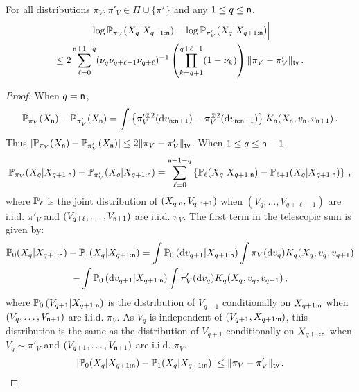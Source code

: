 \begin{lemma}\label{lem:IncrementsGen}
For all distributions $\pi_V,\pi'_V\in\Pi\cup\{\pi^{\star}\}$ and any $1\le q\le {\mathsf n}$,
\begin{multline*}
\left|\log \mathbb{P}_{\pi_V}(X_{q}|X_{q+1:{\mathsf n}}) - \log \mathbb{P}_{\pi'_V}(X_{q}|X_{q+1:{\mathsf n}})\right| \\
\leq 2\sum_{\ell= 0}^{{\mathsf n}+1-q}(\nu_{q}\nu_{q+\ell-1}\nu_{q+\ell})^{-1}\left(\prod_{k = q+1}^{q+\ell-1}(1-\nu_k)\right)\|\pi_V-\pi'_V\|_{\mathsf{tv}}\,.
\end{multline*}
\end{lemma}
\begin{proof}
When $q={\mathsf n}$,
\[
\mathbb{P}_{\pi_V}(X_{{\mathsf n}}) - \mathbb{P}_{\pi'_V}(X_{{\mathsf n}}) = \int\left\{\pi'^{\otimes 2}_V(\mathrm{d} v_{{\mathsf n}:{\mathsf n}+1})-\pi^{\otimes 2}_V(\mathrm{d} v_{{\mathsf n}:{\mathsf n}+1})\right\}K_{{\mathsf n}}(X_{{\mathsf n}},v_{{\mathsf n}},v_{{\mathsf n}+1})\,.
\]
Thus $|\mathbb{P}_{\pi_V}(X_{{\mathsf n}}) - \mathbb{P}_{\pi'_V}(X_{{\mathsf n}})|\le 2 \|\pi_V-\pi'_V\|_{\mathsf{tv}}$.
When $1\le q\le {\mathsf n}-1$,
\begin{equation*}
\mathbb{P}_{\pi_V}(X_{q}|X_{q+1:{\mathsf n}}) - \mathbb{P}_{\pi'_V}(X_{q}|X_{q+1:{\mathsf n}}) 
= \sum_{\ell= 0}^{{\mathsf n}+1-q}\left\{\mathbb{P}_{\ell}(X_{q}|X_{q+1:{\mathsf n}}) - \mathbb{P}_{\ell+1}(X_{q}|X_{q+1:{\mathsf n}})\right\}\,,
\end{equation*}
where $\mathbb{P}_{\ell}$ is the joint distribution of $(X_{q:{\mathsf n}},V_{q:{\mathsf n}+1})$ when $(V_q,\ldots,V_{q+\ell-1})$ are i.i.d. $\pi'_V$ and $(V_{q+\ell},\ldots,V_{{\mathsf n}+1})$ are i.i.d. $\pi_V$. The first term in the telescopic sum is given by:
\begin{multline*}
\mathbb{P}_{0}(X_{q}|X_{q+1:{\mathsf n}}) - \mathbb{P}_{1}(X_{q}|X_{q+1:{\mathsf n}}) = \int \mathbb{P}_{0}\left(\mathrm{d} v_{q+1}\middle | X_{q+1:{\mathsf n}}\right)\int\pi_V(\mathrm{d} v_q)K_{q}(X_q,v_q,v_{q+1})\\
- \int \mathbb{P}_{0}\left(\mathrm{d} v_{q+1}\middle | X_{q+1:{\mathsf n}}\right)\int\pi'_V(\mathrm{d} v_q)K_{q}(X_q,v_q,v_{q+1})\,,
\end{multline*}
where $\mathbb{P}_{0}\left(V_{q+1}\middle | X_{q+1:{\mathsf n}}\right)$ is the distribution of $V_{q+1}$ conditionally on $X_{q+1:{\mathsf n}}$ when $(V_{q},\ldots,V_{{\mathsf n}+1})$ are i.i.d. $\pi_V$. As $V_q$ is independent of $(V_{q+1},X_{q+1:{\mathsf n}})$, this distribution is the same as the distribution of $V_{q+1}$ conditionally on $X_{q+1:{\mathsf n}}$ when $V_q\sim \pi'_V$ and $(V_{q+1},\ldots,V_{{\mathsf n}+1})$ are i.i.d. $\pi_V$. 
\[
\left|\mathbb{P}_{0}(X_{q}|X_{q+1:{\mathsf n}}) - \mathbb{P}_{1}(X_{q}|X_{q+1:{\mathsf n}})\right|\le\|\pi_V-\pi'_V\|_{\mathsf{tv}}\,.
\]
\end{proof}
